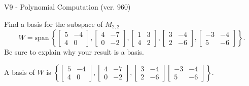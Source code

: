 \begin{exercise}
  \begin{exerciseTitle}V9 - Polynomial Computation (ver. 960)\end{exerciseTitle}
  \begin{exerciseStatement}
    Find a basis for the subspace of \(M_{2,2}\) 
\[W=\mathrm{span}\ \left\{\left[\begin{array}{cc}
5 & -4 \\
4 & 0
\end{array}\right] , \left[\begin{array}{cc}
4 & -7 \\
0 & -2
\end{array}\right] , \left[\begin{array}{cc}
1 & 3 \\
4 & 2
\end{array}\right] , \left[\begin{array}{cc}
3 & -4 \\
2 & -6
\end{array}\right] , \left[\begin{array}{cc}
-3 & -4 \\
5 & -6
\end{array}\right]\right\}.\]
 Be sure to explain why your result is a basis.


  \end{exerciseStatement}
  \begin{exerciseAnswer}
   A basis of \(W\) is  \(\left\{\left[\begin{array}{cc}
5 & -4 \\
4 & 0
\end{array}\right] , \left[\begin{array}{cc}
4 & -7 \\
0 & -2
\end{array}\right] , \left[\begin{array}{cc}
3 & -4 \\
2 & -6
\end{array}\right] \left[\begin{array}{cc}
-3 & -4 \\
5 & -6
\end{array}\right]\right\}\).
  


  \end{exerciseAnswer}
\end{exercise}